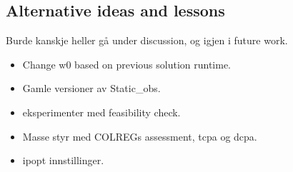 \subsection{Alternative ideas and lessons}
Burde kanskje heller gå under discussion, og igjen i future work.
\begin{itemize}
    \item Change w0 based on previous solution runtime.
    \item Gamle versioner av Static\_obs.
    \item eksperimenter med feasibility check.
    \item Masse styr med COLREGs assessment, tcpa og dcpa.
    \item ipopt innstillinger.
\end{itemize}
\newpage